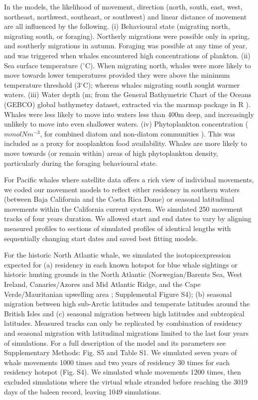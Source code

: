 \documentclass[a4paper,12pt]{article}
\begin{document}
In the models, the likelihood of movement, direction (north, south, east, west, northeast, northwest, southeast, or southwest) and linear distance of movement are all influenced by the following. 
(i) Behavioural state (migrating north, migrating south, or foraging).
Northerly migrations were possible only in spring, and southerly migrations in autumn. 
Foraging was possible at any time of year, and was triggered when whales encountered high concentrations of plankton.
(ii) Sea surface temperature \cite{yool2013medusa} ($^{\circ}$C). 
When migrating north, whales were more likely to move towards lower temperatures provided they were above the minimum temperature threshold (3$^{\circ}$C); whereas whales migrating south sought warmer waters.  
(iii) Water depth (m; from the General Bathymetric Chart of the Oceans (GEBCO) global bathymetry dataset\cite{bathy}, extracted via the marmap package in R \cite{marmap}). 
Whales were less likely to move into waters less than 400m deep, and increasingly unlikely to move into even shallower waters. 
(iv) Phytoplankton concentration ($mmolNm^{-3}$, for combined diatom and non-diatom communities \cite{yool2013medusa}). 
This was included as a proxy for zooplankton food availability. 
Whales are more likely to move towards (or remain within) areas of high phytoplankton density, particularly during the foraging behavioural state. 

For Pacific whales where satellite data offers a rich view of individual movements, we coded our movement models to reflect either residency in southern waters (between Baja California and the Costa Rica Dome) or seasonal latitudinal movements within the California current system. 
We simulated 250 movement tracks of four years duration. 
We allowed start and end dates to vary by aligning measured profiles to sections of simulated profiles of identical lengths with sequentially changing start dates and saved best fitting models.

For the historic North Atlantic whale, we simulated the isotopicexpression expected for (a) residency in each known hotspot for blue whale sightings or historic hunting grounds in the North Atlantic (Norwegian/Barents Sea, West Ireland, Canaries/Azores and Mid Atlantic Ridge, and the Cape Verde/Mauritanian upwelling area \cite{mcdonald2006biogeographic,reilly2008balaenoptera,sigurjonsson1995life}; Supplemental Figure S4); (b) seasonal migration between high sub-Arctic latitudes and temperate latitudes around the British Isles and (c) seasonal migration between high latitudes and subtropical latitudes.
Measured tracks can only be replicated by combination of residency and seasonal migration with latitudinal migrations limited to the last four
years of simulations. 
For a full description of the model and its parameters see Supplementary Methods: Fig. S5 and Table S1. 
We simulated seven years of whale movements 1000 times and two years of residency 30 times for each residency hotspot (Fig. S4).
We simulated whale movements 1200 times, then excluded simulations where the virtual whale stranded before reaching the 3019 days of the baleen record, leaving 1049 simulations.
\end{document}
